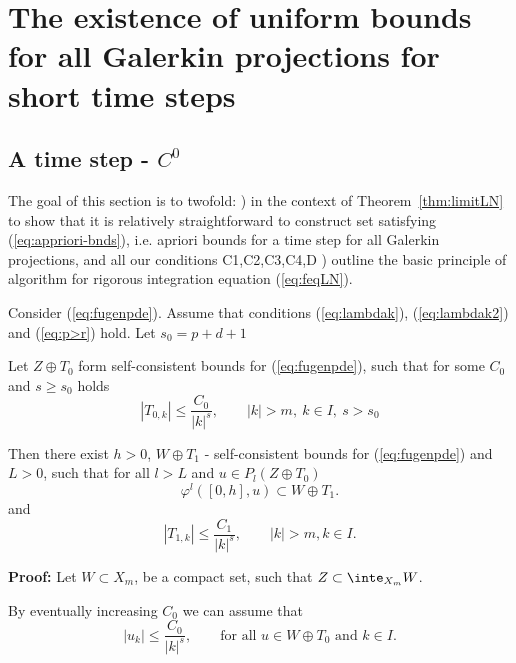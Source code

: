 

\section{The existence of uniform bounds for all Ga\-ler\-kin
  projections for short time steps}
\label{sec:gendiss}




\subsection{A time step - $C^0$}
\label{subsec:C0-timestep}

The goal of this section is to twofold: ) in the context of Theorem~\ref{thm:limitLN} to show that it is relatively straightforward to construct set satisfying  (\ref{eq:appriori-bnds}), i.e. apriori bounds for a time step for all Galerkin projections,  and all our conditions C1,C2,C3,C4,D ) outline the basic principle of algorithm for rigorous integration equation (\ref{eq:feqLN}).


	
	
\begin{theorem}  \cite[Thm. 3.7]{ZKS3}
\label{thm:selfexists} Consider (\ref{eq:fugenpde}). Assume that
conditions (\ref{eq:lambdak}), (\ref{eq:lambdak2}) and
(\ref{eq:p>r}) hold. Let $s_0=p+d+1$


Let  $Z \oplus T_0$ form self-consistent bounds for
(\ref{eq:fugenpde}), such that for some $C_0$ and $s \geq s_0$
holds
\begin{equation*}
  |T_{0,k}| \leq \frac{C_0}{|k|^{s}}, \qquad |k| >m,\: k \in I, \:
  s> s_0
\end{equation*}

Then there exist $h >0$, $W \oplus T_1$ - self-consistent bounds
for (\ref{eq:fugenpde}) and $L >0$, such that for all $l >L$ and
$u \in  P_l(Z \oplus T_0)$
\begin{equation*}
  \varphi^l([0,h],u) \subset W \oplus T_1.
\end{equation*}
and
\begin{equation*}
  |T_{1,k}| \leq \frac{C_1}{|k|^{s}}, \qquad |k|>m, k \in I.
\end{equation*}
\end{theorem}
\textbf{Proof:} Let $W \subset X_m$, be  a compact set, such that
$Z \subset \inte_{X_m} W$.

By eventually increasing $C_0$ we can assume that
\begin{equation*}
  |u_k| \leq \frac{C_0}{|k|^{s}}, \qquad \mbox{for all  $u \in W \oplus T_0$ and $k \in
  I$}.
\end{equation*}

